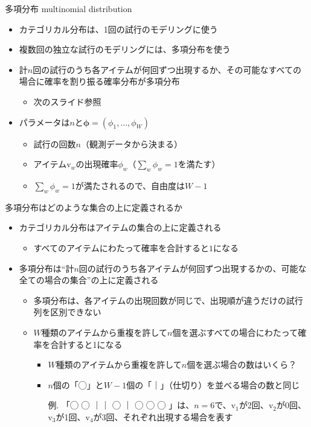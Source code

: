 \documentclass[aspectratio=169,unicode,dvipdfmx,14pt]{beamer}
\begin{document}
\begin{frame}{多項分布 multinomial distribution}
\begin{itemize}
\item カテゴリカル分布は、1回の試行のモデリングに使う
\item 複数回の独立な試行のモデリングには、多項分布を使う
\item 計$n$回の試行のうち各アイテムが何回ずつ出現するか、その可能なすべての場合に確率を割り振る確率分布が多項分布
\begin{itemize}
\item 次のスライド参照
\end{itemize}
\item パラメータは$n$と$\bm{\phi}=(\phi_1,\ldots,\phi_W)$
\begin{itemize}
\item 試行の回数$n$（観測データから決まる）
\item アイテム$\mbox{v}_w$の出現確率$\phi_w$（$\sum_w \phi_w = 1$を満たす）
\item $\sum_w \phi_w=1$が満たされるので、自由度は$W-1$
\end{itemize}
\end{itemize}
\end{frame}

\begin{frame}{多項分布はどのような集合の上に定義されるか}
\begin{itemize}
\item カテゴリカル分布はアイテムの集合の上に定義される
\begin{itemize}
\item すべてのアイテムにわたって確率を合計すると$1$になる
\end{itemize}
\item 多項分布は``計$n$回の試行のうち各アイテムが何回ずつ出現するかの、可能な全ての場合の集合''の上に定義される
\begin{itemize}
\item 多項分布は、各アイテムの出現回数が同じで、出現順が違うだけの試行列を区別できない
\item $W$種類のアイテムから重複を許して$n$個を選ぶすべての場合にわたって確率を合計すると1になる
\begin{itemize}
\item $W$種類のアイテムから重複を許して$n$個を選ぶ場合の数はいくら？
\item $n$個の「◯」と$W-1$個の「｜」（仕切り）を並べる場合の数と同じ
\item[例.] 「◯ ◯ ｜｜ ◯ ｜ ◯ ◯ ◯ 」は、$n=6$で、$\mbox{v}_1$が2回、$\mbox{v}_2$が0回、$\mbox{v}_3$が1回、$\mbox{v}_4$が3回、それぞれ出現する場合を表す
\end{itemize}
\end{itemize}
\end{itemize}
\end{frame}
\end{document}
